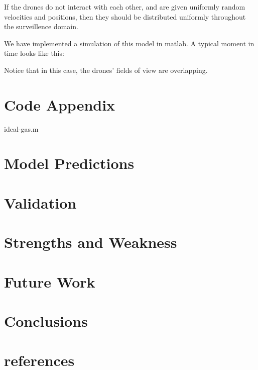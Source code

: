 \documentclass{article}
\begin{document}
If the drones do not interact with each other, and are given uniformly random velocities and positions, then they should be distributed uniformly throughout the surveillence domain.

We have implemented a simulation of this model in matlab.
A typical moment in time looks like this:

\begin{figure}[h]
\begin{center}
\begin{tikzpicture}
\end{tikzpicture}
\end{center}
\end{figure}

Notice that in this case, the drones' fields of view are overlapping.

\section{Code Appendix}

{ideal-gas.m}

\section{Model Predictions}
\section{Validation}
\section{Strengths and Weakness}
\section{Future Work}
\section{Conclusions}
\section{references}
\end{document}
